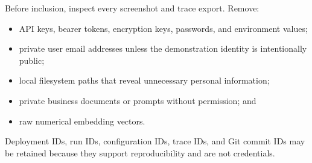 Before inclusion, inspect every screenshot and trace export. Remove:

\begin{itemize}
  \item API keys, bearer tokens, encryption keys, passwords, and environment
  values;
  \item private user email addresses unless the demonstration identity is
  intentionally public;
  \item local filesystem paths that reveal unnecessary personal information;
  \item private business documents or prompts without permission; and
  \item raw numerical embedding vectors.
\end{itemize}

Deployment IDs, run IDs, configuration IDs, trace IDs, and Git commit IDs may
be retained because they support reproducibility and are not credentials.
